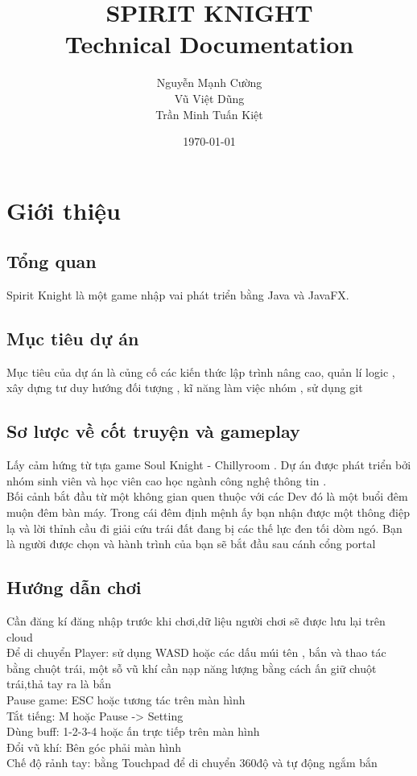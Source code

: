 \documentclass[12pt,a4paper]{report}
\title{
    \Huge\textbf{SPIRIT KNIGHT}\\[0.5cm]
    \Large Technical Documentation
}
\author{Nguyễn Mạnh Cường \\
Vũ Việt Dũng \\
Trần Minh Tuấn Kiệt
}
\date{\today}
\begin{document}
    \maketitle
    \tableofcontents


    \chapter{Giới thiệu}


    \section{Tổng quan}

    Spirit Knight là một game nhập vai phát triển bằng Java và JavaFX.


    \section{Mục tiêu dự án}

    Mục tiêu của dự án là củng cố các kiến thức lập trình nâng cao, quản lí logic , xây dựng tư duy hướng đối tượng ,
    kĩ năng làm việc nhóm , sử dụng git


    \section{Sơ lược về cốt truyện và gameplay}
    Lấy cảm hứng từ tựa game Soul Knight - Chillyroom . Dự án được phát triển bởi nhóm sinh viên và học viên cao
    học ngành công nghệ thông tin . \\
    Bối cảnh bắt đầu từ một không gian quen thuộc với các Dev đó là một buổi đêm muộn đêm bàn máy.
    Trong cái đêm định mệnh ấy bạn nhận được một thông điệp lạ và lời thỉnh cầu đi giải cứu trái đất
    đang bị các thế lực đen tối dòm ngó. Bạn là người được chọn và hành trình của bạn sẽ bắt đầu
    sau cánh cổng portal


    \section{Hướng dẫn chơi}
    Cần đăng kí đăng nhập trước khi chơi,dữ liệu người chơi sẽ được lưu lại trên cloud\\
    Để di chuyển Player: sử dụng WASD hoặc các dấu múi tên , bắn và thao tác bằng chuột trái, một sỗ
    vũ khí cần nạp năng lượng bằng cách ấn giữ chuột trái,thả tay ra là bắn\\
    Pause game: ESC hoặc tương tác trên màn hình\\
    Tắt tiếng: M hoặc Pause -> Setting\\
    Dùng buff: 1-2-3-4 hoặc ấn trực tiếp trên màn hình\\
    Đổi vũ khí: Bên góc phải màn hình\\
    Chế độ rảnh tay: bằng Touchpad để di chuyển 360độ và tự động ngắm bắn\\
\end{document}
